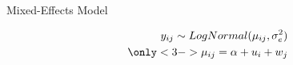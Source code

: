 \begin{frame}[fragile]{Mixed-Effects Model}
	
	\begin{minipage}{.45\textwidth}
		\begin{equation*}
			\begin{aligned}	
				y_{ij} \sim LogNormal(\mu_{ij}, \sigma_{e}^2) \\
				\only<3->{\mu_{ij} = \alpha + u_i + w_j}
			\end{aligned}
		\end{equation*}
	\end{minipage}	
	\hfill
	\begin{minipage}{.45\textwidth}	
	\end{minipage}

\end{frame}




